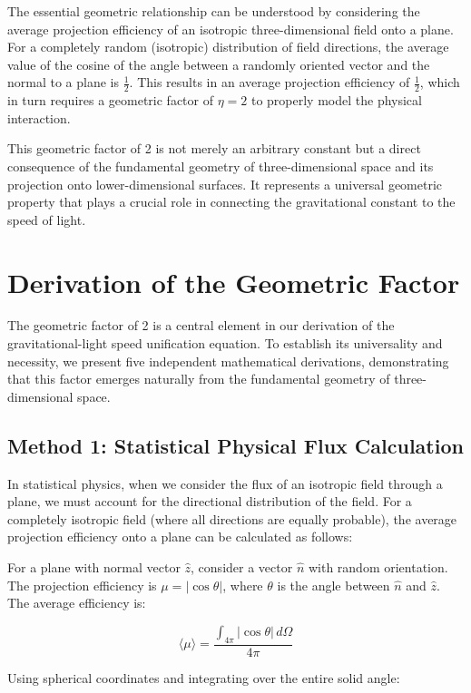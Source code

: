 \documentclass[nature,numbers]{article}
\begin{document}
The essential geometric relationship can be understood by considering the average projection efficiency of an isotropic three-dimensional field onto a plane. For a completely random (isotropic) distribution of field directions, the average value of the cosine of the angle between a randomly oriented vector and the normal to a plane is $\frac{1}{2}$. This results in an average projection efficiency of $\frac{1}{2}$, which in turn requires a geometric factor of $\eta = 2$ to properly model the physical interaction.

This geometric factor of 2 is not merely an arbitrary constant but a direct consequence of the fundamental geometry of three-dimensional space and its projection onto lower-dimensional surfaces. It represents a universal geometric property that plays a crucial role in connecting the gravitational constant to the speed of light.

\section{Derivation of the Geometric Factor}

The geometric factor of 2 is a central element in our derivation of the gravitational-light speed unification equation. To establish its universality and necessity, we present five independent mathematical derivations, demonstrating that this factor emerges naturally from the fundamental geometry of three-dimensional space.

\subsection{Method 1: Statistical Physical Flux Calculation}

In statistical physics, when we consider the flux of an isotropic field through a plane, we must account for the directional distribution of the field. For a completely isotropic field (where all directions are equally probable), the average projection efficiency onto a plane can be calculated as follows:

For a plane with normal vector $\hat{z}$, consider a vector $\hat{n}$ with random orientation. The projection efficiency is $\mu = |\cos\theta|$, where $\theta$ is the angle between $\hat{n}$ and $\hat{z}$. The average efficiency is:

$$\langle \mu \rangle = \frac{\int_{4\pi} |\cos\theta| \, d\Omega}{4\pi}$$

Using spherical coordinates and integrating over the entire solid angle:
\end{document}
